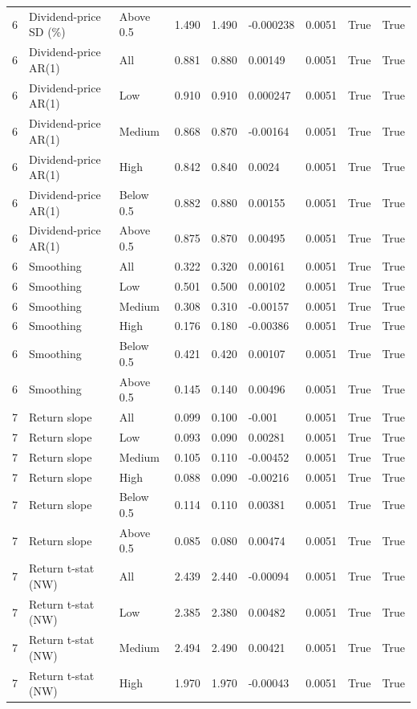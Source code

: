 \documentclass[10pt]{article}
\begin{document}
\begin{landscape}
\begin{longtable}{rllrrllrr}
6 & Dividend-price SD (\%) & Above 0.5 & 1.490 & 1.490 & -0.000238 & 0.0051 & True & True \\
6 & Dividend-price AR(1) & All & 0.881 & 0.880 & 0.00149 & 0.0051 & True & True \\
6 & Dividend-price AR(1) & Low & 0.910 & 0.910 & 0.000247 & 0.0051 & True & True \\
6 & Dividend-price AR(1) & Medium & 0.868 & 0.870 & -0.00164 & 0.0051 & True & True \\
6 & Dividend-price AR(1) & High & 0.842 & 0.840 & 0.0024 & 0.0051 & True & True \\
6 & Dividend-price AR(1) & Below 0.5 & 0.882 & 0.880 & 0.00155 & 0.0051 & True & True \\
6 & Dividend-price AR(1) & Above 0.5 & 0.875 & 0.870 & 0.00495 & 0.0051 & True & True \\
6 & Smoothing & All & 0.322 & 0.320 & 0.00161 & 0.0051 & True & True \\
6 & Smoothing & Low & 0.501 & 0.500 & 0.00102 & 0.0051 & True & True \\
6 & Smoothing & Medium & 0.308 & 0.310 & -0.00157 & 0.0051 & True & True \\
6 & Smoothing & High & 0.176 & 0.180 & -0.00386 & 0.0051 & True & True \\
6 & Smoothing & Below 0.5 & 0.421 & 0.420 & 0.00107 & 0.0051 & True & True \\
6 & Smoothing & Above 0.5 & 0.145 & 0.140 & 0.00496 & 0.0051 & True & True \\
7 & Return slope & All & 0.099 & 0.100 & -0.001 & 0.0051 & True & True \\
7 & Return slope & Low & 0.093 & 0.090 & 0.00281 & 0.0051 & True & True \\
7 & Return slope & Medium & 0.105 & 0.110 & -0.00452 & 0.0051 & True & True \\
7 & Return slope & High & 0.088 & 0.090 & -0.00216 & 0.0051 & True & True \\
7 & Return slope & Below 0.5 & 0.114 & 0.110 & 0.00381 & 0.0051 & True & True \\
7 & Return slope & Above 0.5 & 0.085 & 0.080 & 0.00474 & 0.0051 & True & True \\
7 & Return t-stat (NW) & All & 2.439 & 2.440 & -0.00094 & 0.0051 & True & True \\
7 & Return t-stat (NW) & Low & 2.385 & 2.380 & 0.00482 & 0.0051 & True & True \\
7 & Return t-stat (NW) & Medium & 2.494 & 2.490 & 0.00421 & 0.0051 & True & True \\
7 & Return t-stat (NW) & High & 1.970 & 1.970 & -0.00043 & 0.0051 & True & True \\
\end{longtable}


\end{landscape}
\end{document}
